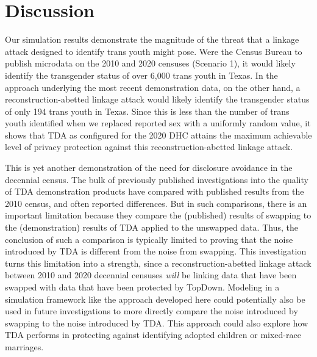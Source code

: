 \documentclass{jpc} %
\theoremstyle{plain}\newtheorem{satz}[thm]{Satz} %
\begin{document}
\section{Discussion}

Our simulation results demonstrate the magnitude of the threat that a linkage attack designed to identify trans youth might pose.  Were the Census Bureau to publish microdata on the 2010 and 2020 censuses (Scenario 1), it would likely identify the transgender status of over 6,000 trans youth in Texas.  In the approach underlying the most recent demonstration data, on the other hand, a reconstruction-abetted linkage attack would likely identify the transgender status of only 194 trans youth in Texas.  Since this is less than the number of trans youth identified when we replaced reported sex with a uniformly random value, it shows that TDA as configured for the 2020 DHC attains the maximum achievable level of privacy protection against this reconstruction-abetted linkage attack.

This is yet another demonstration of the need for disclosure avoidance in the decennial census.  The bulk of previously published investigations into the quality of TDA demonstration products have compared with published results from the 2010 census, and often reported differences.  But in such comparisons, there is an important limitation because they compare the (published) results of swapping to the (demonstration) results of TDA applied to the unswapped data.  Thus, the conclusion of such a comparison is typically limited to proving that the noise introduced by TDA is different from the noise from swapping.
This investigation turns this limitation into a strength, since a reconstruction-abetted linkage attack between 2010 and 2020 decennial censuses \emph{will} be linking data that have been swapped with data that have been protected by TopDown.
Modeling in a simulation framework like the approach developed here could potentially also be used in future investigations to more directly compare the noise introduced by swapping to the noise introduced by TDA.  This approach could also explore how TDA performs in protecting against identifying adopted children or mixed-race marriages.
\end{document}
